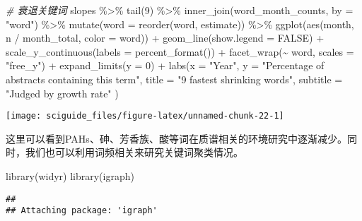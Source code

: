 \documentclass[]{tufte-book}
\newenvironment{Shaded}{}{}
\newcommand{\AttributeTok}[1]{\textcolor[rgb]{0.49,0.56,0.16}{#1}}
\newcommand{\CommentTok}[1]{\textcolor[rgb]{0.38,0.63,0.69}{\textit{#1}}}
\newcommand{\ConstantTok}[1]{\textcolor[rgb]{0.53,0.00,0.00}{#1}}
\newcommand{\DecValTok}[1]{\textcolor[rgb]{0.25,0.63,0.44}{#1}}
\newcommand{\FunctionTok}[1]{\textcolor[rgb]{0.02,0.16,0.49}{#1}}
\newcommand{\NormalTok}[1]{#1}
\newcommand{\SpecialCharTok}[1]{\textcolor[rgb]{0.25,0.44,0.63}{#1}}
\newcommand{\StringTok}[1]{\textcolor[rgb]{0.25,0.44,0.63}{#1}}
\begin{document}
\begin{Shaded}
\begin{Highlighting}[]
\CommentTok{\# 衰退关键词}
\NormalTok{slopes }\SpecialCharTok{\%\textgreater{}\%}
  \FunctionTok{tail}\NormalTok{(}\DecValTok{9}\NormalTok{) }\SpecialCharTok{\%\textgreater{}\%}
  \FunctionTok{inner\_join}\NormalTok{(word\_month\_counts, }\AttributeTok{by =} \StringTok{"word"}\NormalTok{) }\SpecialCharTok{\%\textgreater{}\%}
  \FunctionTok{mutate}\NormalTok{(}\AttributeTok{word =} \FunctionTok{reorder}\NormalTok{(word, estimate)) }\SpecialCharTok{\%\textgreater{}\%}
  \FunctionTok{ggplot}\NormalTok{(}\FunctionTok{aes}\NormalTok{(month, n }\SpecialCharTok{/}\NormalTok{ month\_total, }\AttributeTok{color =}\NormalTok{ word)) }\SpecialCharTok{+}
  \FunctionTok{geom\_line}\NormalTok{(}\AttributeTok{show.legend =} \ConstantTok{FALSE}\NormalTok{) }\SpecialCharTok{+}
  \FunctionTok{scale\_y\_continuous}\NormalTok{(}\AttributeTok{labels =} \FunctionTok{percent\_format}\NormalTok{()) }\SpecialCharTok{+}
  \FunctionTok{facet\_wrap}\NormalTok{(}\SpecialCharTok{\textasciitilde{}}\NormalTok{ word, }\AttributeTok{scales =} \StringTok{"free\_y"}\NormalTok{) }\SpecialCharTok{+}
  \FunctionTok{expand\_limits}\NormalTok{(}\AttributeTok{y =} \DecValTok{0}\NormalTok{) }\SpecialCharTok{+}
  \FunctionTok{labs}\NormalTok{(}\AttributeTok{x =} \StringTok{"Year"}\NormalTok{,}
       \AttributeTok{y =} \StringTok{"Percentage of abstracts containing this term"}\NormalTok{,}
       \AttributeTok{title =} \StringTok{"9 fastest shrinking words"}\NormalTok{,}
       \AttributeTok{subtitle =} \StringTok{"Judged by growth rate"}
\NormalTok{              )}
\end{Highlighting}
\end{Shaded}

\texttt{[image: sciguide\_files/figure-latex/unnamed-chunk-22-1]}

这里可以看到PAHs、砷、芳香族、酸等词在质谱相关的环境研究中逐渐减少。同时，我们也可以利用词频相关来研究关键词聚类情况。

\begin{Shaded}
\begin{Highlighting}[]
\FunctionTok{library}\NormalTok{(widyr)}
\FunctionTok{library}\NormalTok{(igraph)}
\end{Highlighting}
\end{Shaded}

\begin{verbatim}
## 
## Attaching package: 'igraph'
\end{verbatim}
\end{document}
